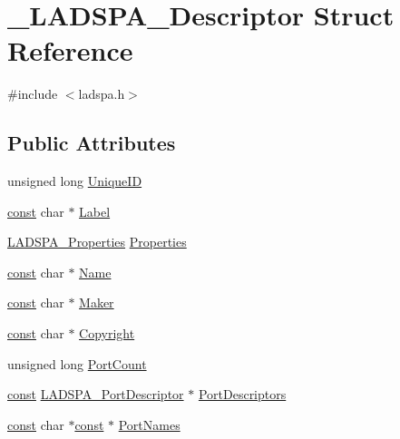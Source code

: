 \hypertarget{struct___l_a_d_s_p_a___descriptor}{}\section{\+\_\+\+L\+A\+D\+S\+P\+A\+\_\+\+Descriptor Struct Reference}
\label{struct___l_a_d_s_p_a___descriptor}


{\ttfamily \#include $<$ladspa.\+h$>$}

\subsection*{Public Attributes}
\begin{DoxyCompactItemize}
\item 
unsigned long \hyperlink{struct___l_a_d_s_p_a___descriptor_a510d7139c664c769412742f3199ab82d}{Unique\+ID}
\item 
\hyperlink{getopt1_8c_a2c212835823e3c54a8ab6d95c652660e}{const} char $\ast$ \hyperlink{struct___l_a_d_s_p_a___descriptor_afbd2609738f6fe55bb31701371363516}{Label}
\item 
\hyperlink{src_2effects_2ladspa_2ladspa_8h_a05dff5c988598101d21699d13e7ed87e}{L\+A\+D\+S\+P\+A\+\_\+\+Properties} \hyperlink{struct___l_a_d_s_p_a___descriptor_a7c5385a6bc9fba16b5ef02f41d6e3899}{Properties}
\item 
\hyperlink{getopt1_8c_a2c212835823e3c54a8ab6d95c652660e}{const} char $\ast$ \hyperlink{struct___l_a_d_s_p_a___descriptor_aca33ae196b54239c35f21ebe2aca03b2}{Name}
\item 
\hyperlink{getopt1_8c_a2c212835823e3c54a8ab6d95c652660e}{const} char $\ast$ \hyperlink{struct___l_a_d_s_p_a___descriptor_a9c024728a199b1ba00662c3e7113a000}{Maker}
\item 
\hyperlink{getopt1_8c_a2c212835823e3c54a8ab6d95c652660e}{const} char $\ast$ \hyperlink{struct___l_a_d_s_p_a___descriptor_aa764f1dfe2a95ec9c4ab55d14c3ea975}{Copyright}
\item 
unsigned long \hyperlink{struct___l_a_d_s_p_a___descriptor_abbb76ce2d2c07e6ca91f7c12a90d8218}{Port\+Count}
\item 
\hyperlink{getopt1_8c_a2c212835823e3c54a8ab6d95c652660e}{const} \hyperlink{src_2effects_2ladspa_2ladspa_8h_a90f9a17bef9e9a9c5e34f2a1973379e2}{L\+A\+D\+S\+P\+A\+\_\+\+Port\+Descriptor} $\ast$ \hyperlink{struct___l_a_d_s_p_a___descriptor_acbd16cbd610dd708c712ea67e05ce805}{Port\+Descriptors}
\item 
\hyperlink{getopt1_8c_a2c212835823e3c54a8ab6d95c652660e}{const} char $\ast$\hyperlink{getopt1_8c_a2c212835823e3c54a8ab6d95c652660e}{const} $\ast$ \hyperlink{struct___l_a_d_s_p_a___descriptor_a2912b6611e0d187cc7a7a9ae251df518}{Port\+Names}

\end{DoxyCompactItemize}
